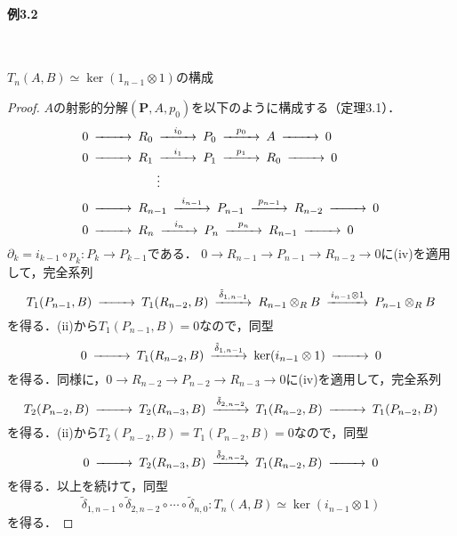 \paragraph{例3.2}~
\begin{screen}
  $T_n(A, B) \simeq \ker (1_{n-1} \otimes 1)$の構成
\end{screen}
\begin{proof}
  $A$の射影的分解$(\boldsymbol{P}, A, p_0)$を以下のように構成する（定理3.1）．
  \begin{align}
    &
    \begin{CD}
      0 @>>> R_0 @>{i_0}>> P_0 @>{p_0}>> A @>>> 0
    \end{CD}
    \notag\\
    &
    \begin{CD}
      0 @>>> R_1 @>{i_1}>> P_1 @>{p_1}>> R_0 @>>> 0
    \end{CD}
    \notag\\
    & \qquad\qquad\qquad\vdots\notag\\
    &
    \begin{CD}
      0 @>>> R_{n-1} @>{i_{n-1}}>> P_{n-1} @>{p_{n-1}}>> R_{n-2} @>>> 0
    \end{CD}
    \notag\\
    &
    \begin{CD}
      0 @>>> R_n @>{i_n}>> P_n @>{p_n}>> R_{n-1} @>>> 0
    \end{CD}
    \label{exm_3_2_eq_0}
  \end{align}
  $\partial_k = i_{k-1} \circ p_k \colon P_{k} \to P_{k-1}$である．
  $0 \to R_{n-1} \to P_{n-1} \to R_{n-2} \to 0$に(iv)を適用して，完全系列
  \begin{align}
    \begin{CD}
      T_1 (P_{n-1}, B) @>>> T_1 (R_{n-2}, B) @>{\tilde{\delta}_{1, n-1}}>> R_{n-1} \otimes_R B @>{i_{n-1} \otimes 1}>> P_{n-1} \otimes_R B
    \end{CD}
    \label{exm_3_2_eq_1}
  \end{align}
  を得る．(ii)から$T_1 (P_{n-1}, B) = 0$なので，同型
  \[
  \begin{CD}
    0 @>>> T_1 (R_{n-2}, B) @>{\tilde{\delta}_{1, n-1}}>> \ker (i_{n-1} \otimes 1) @>>> 0
  \end{CD}
  \]
  を得る．同様に，$0 \to R_{n-2} \to P_{n-2} \to R_{n-3} \to 0$に(iv)を適用して，完全系列
  \[
  \begin{CD}
    T_2 (P_{n-2}, B) @>>> T_2 (R_{n-3}, B) @>{\tilde{\delta}_{2, n-2}}>> T_1 (R_{n-2}, B) @>>> T_1 (P_{n-2}, B)
  \end{CD}
  \]
  を得る．(ii)から$T_2 (P_{n-2}, B) = T_1 (P_{n-2}, B) = 0$なので，同型
  \begin{align}
    \begin{CD}
      0 @>>> T_2 (R_{n-3}, B) @>{\tilde{\delta}_{2, n-2}}>> T_1 (R_{n-2}, B) @>>> 0
    \end{CD}
    \label{exm_3_2_eq_2}
  \end{align}
  を得る．以上を続けて，同型
  \[ \tilde{\delta}_{1, n-1} \circ \tilde{\delta}_{2, n-2} \circ \cdots \circ \tilde{\delta}_{n, 0} \colon T_n (A, B) \simeq \ker (i_{n-1} \otimes 1) \]
  を得る．
\end{proof}

